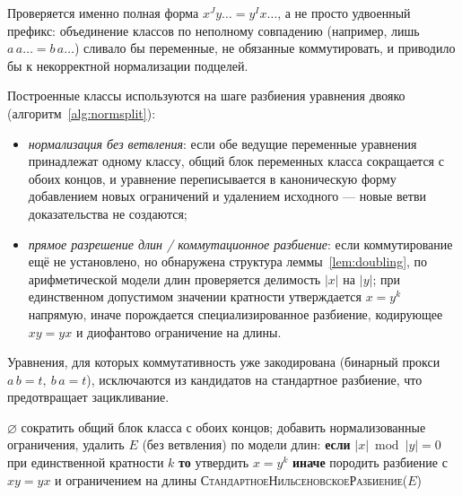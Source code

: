 \documentclass[14pt, russian]{scrartcl}
\begin{document}
Проверяется именно полная форма $x^{J} y\dots = y^{I} x\dots$, а не просто удвоенный
префикс: объединение классов по неполному совпадению (например, лишь
$a\,a\dots = b\,a\dots$) сливало бы переменные, не обязанные коммутировать, и
приводило бы к некорректной нормализации подцелей.

Построенные классы используются на шаге разбиения уравнения двояко
(алгоритм~\ref{alg:normsplit}):
\begin{itemize}
\item \textit{нормализация без ветвления}: если обе ведущие переменные уравнения
  принадлежат одному классу, общий блок переменных класса сокращается с обоих концов,
  и уравнение переписывается в каноническую форму добавлением новых ограничений и
  удалением исходного --- новые ветви доказательства не создаются;
\item \textit{прямое разрешение длин / коммутационное разбиение}: если коммутирование ещё
  не установлено, но обнаружена структура леммы~\ref{lem:doubling}, по арифметической
  модели длин проверяется делимость $|x|$ на $|y|$; при единственном допустимом
  значении кратности утверждается $x = y^{k}$ напрямую, иначе порождается
  специализированное разбиение, кодирующее $x y = y x$ и диофантово ограничение на
  длины.
\end{itemize}
Уравнения, для которых коммутативность уже закодирована (бинарный прокси
$a\,b = t,\ b\,a = t$), исключаются из кандидатов на стандартное разбиение, что
предотвращает зацикливание.

\begin{algorithm}[h!]
\caption{Нормализация либо разбиение с учётом классов коммутации}
\label{alg:normsplit}
\begin{algorithmic}[1]
   \Return $\varnothing$  \EndIf
     \State сократить общий блок класса с обоих концов;
            добавить нормализованные ограничения, удалить $E$
     \State \Return (без ветвления)
     \State по модели длин: \textbf{если} $|x| \bmod |y| = 0$ при единственной
            кратности $k$ \textbf{то} утвердить $x = y^{k}$
     \State \textbf{иначе} породить разбиение с $x y = y x$ и ограничением на длины
  \Else
     \State \Return \textsc{СтандартноеНильсеновскоеРазбиение}($E$)
  \EndIf
\EndFunction
\end{algorithmic}
\end{algorithm}
\end{document}
